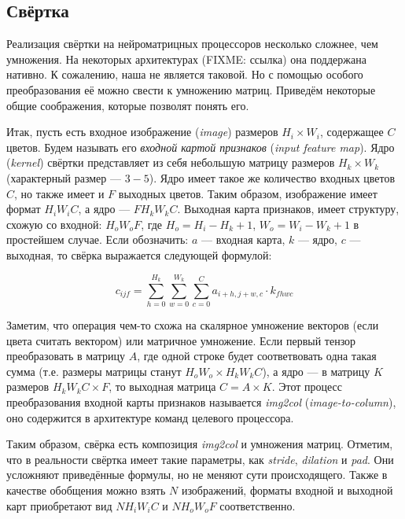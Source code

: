 \subsection{Свёртка}

Реализация свёртки на нейроматрицных процессоров несколько сложнее, чем умножения.
На некоторых архитектурах (FIXME: ссылка) она поддержана нативно. К сожалению, наша
не является таковой. Но с помощью особого преобразования её можно свести к 
умножению матриц. Приведём некоторые общие соображения, которые позволят понять его.

Итак, пусть есть входное изображение (\textit{image}) размеров $H_i \times W_i$,
содержащее $C$ цветов. Будем называть его \textit{входной картой признаков}
(\textit{input feature map}). Ядро (\textit{kernel}) свёртки представляет из
себя небольшую матрицу размеров $H_k \times W_k$ (характерный размер --- $3-5$).
Ядро имеет такое же количество входных цветов $C$, но также имеет и $F$
выходных цветов. Таким образом, изображение имеет формат $H_i W_i C$,
а ядро --- $F H_k W_k C$. Выходная карта признаков, имеет структуру, схожую
со входной: $H_o W_o F$, где $H_o = H_i - H_k + 1$, $W_o = W_i - W_k + 1$
в простейшем случае. Если обозначить: $a$ --- входная карта, $k$ --- ядро,
$c$ --- выходная, то свёрка выражается следующей формулой:

\[
    c_{ijf} = \sum \limits_{h = 0}^{H_k} \sum \limits_{w = 0}^{W_k}
              \sum \limits_{c = 0}^{C} a_{i+h, j+w, c} \cdot k_{f h w c}
\]

Заметим, что операция чем-то схожа на скалярное умножение векторов
(если цвета считать вектором) или матричное умножение. Если первый тензор
преобразовать в матрицу $A$, где одной строке будет соответвовать одна
такая сумма (т.е. размеры матрицы станут $H_o W_o \times H_k W_k C$), а
ядро --- в матрицу $K$ размеров $H_k W_k C \times F$, то выходная
матрица $C = A \times K$. Этот процесс преобразования входной карты
признаков называется \textit{img2col} (\textit{image-to-column}),
оно содержится в архитектуре команд целевого процессора.

Таким образом, свёрка есть композиция \textit{img2col} и умножения матриц.
Отметим, что в реальности свёртка имеет такие параметры, как
\textit{stride}, \textit{dilation} и \textit{pad}. Они усложняют
приведённые формулы, но не меняют сути происходящего. Также в
качестве обобщения можно взять $N$ изображений, форматы входной и
выходной карт приобретают вид $N H_i W_i C$ и $N H_o W_o F$ соответственно.

\newpage
